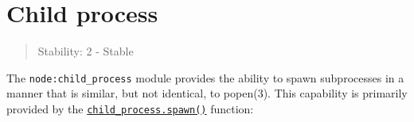 \section{Child process}\label{child-process}

\begin{quote}
Stability: 2 - Stable
\end{quote}

The \texttt{node:child\_process} module provides the ability to spawn
subprocesses in a manner that is similar, but not identical, to
popen(3). This capability is primarily provided by the
\hyperref[child_processspawncommand-args-options]{\texttt{child\_process.spawn()}}
function:

\begin{Shaded}
\begin{Highlighting}[]
\OperatorTok{=} \NormalTok{(}\NormalTok{)}\OperatorTok{;}
\OperatorTok{=} \NormalTok{(}\OperatorTok{,}\NormalTok{ [}\OperatorTok{,} \NormalTok{])}\OperatorTok{;}

\NormalTok{(}\OperatorTok{,}\KeywordTok{=\textgreater{}}\NormalTok{ \{}
  \NormalTok{(}\SpecialCharTok{$\{}\SpecialCharTok{\}}\VerbatimStringTok{\textasciigrave{}}\NormalTok{)}\OperatorTok{;}
\NormalTok{\})}\OperatorTok{;}

\NormalTok{(}\OperatorTok{,}\KeywordTok{=\textgreater{}}\NormalTok{ \{}
  \NormalTok{(}\SpecialCharTok{$\{}\SpecialCharTok{\}}\VerbatimStringTok{\textasciigrave{}}\NormalTok{)}\OperatorTok{;}
\NormalTok{\})}\OperatorTok{;}

\NormalTok{(}\OperatorTok{,}\KeywordTok{=\textgreater{}}\NormalTok{ \{}
  \NormalTok{(}\SpecialCharTok{$\{}\SpecialCharTok{\}}\VerbatimStringTok{\textasciigrave{}}\NormalTok{)}\OperatorTok{;}
\NormalTok{\})}\OperatorTok{;}
\end{Highlighting}
\end{Shaded}

